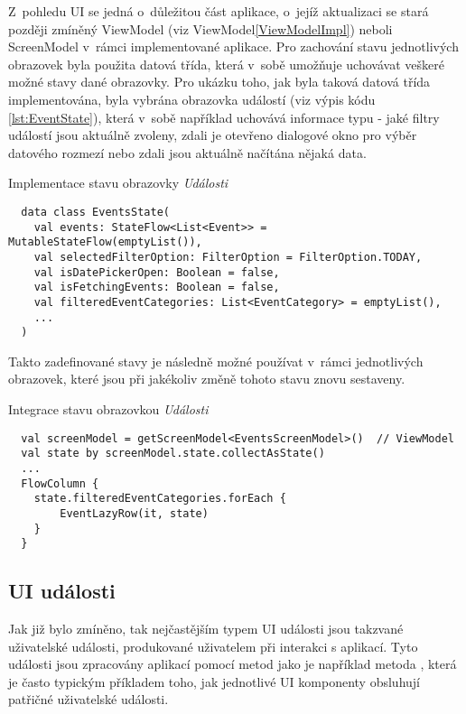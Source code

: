 Z~pohledu UI se jedná o~důležitou část aplikace, o~jejíž aktualizaci se stará později zmíněný ViewModel (viz ViewModel\ref{ViewModelImpl}) neboli ScreenModel v~rámci
implementované aplikace. 
Pro zachování stavu jednotlivých obrazovek byla použita datová třída, která v~sobě umožňuje uchovávat veškeré možné stavy dané obrazovky.
Pro ukázku toho, jak byla taková datová třída implementována, byla vybrána obrazovka událostí (viz výpis kódu \ref{lst:EventState}), která v~sobě 
například uchovává informace typu - jaké filtry událostí jsou aktuálně zvoleny, zdali je otevřeno dialogové okno pro výběr datového rozmezí 
nebo zdali jsou aktuálně načítána nějaká data.
\begin{listing}[H]
\caption{Implementace stavu obrazovky \textit{Události}}\label{lst:EventState}
\begin{verbatim}
  data class EventsState(
    val events: StateFlow<List<Event>> = MutableStateFlow(emptyList()),
    val selectedFilterOption: FilterOption = FilterOption.TODAY,
    val isDatePickerOpen: Boolean = false,
    val isFetchingEvents: Boolean = false,
    val filteredEventCategories: List<EventCategory> = emptyList(),
    ...
  )
\end{verbatim}
\end{listing}

Takto zadefinované stavy je následně možné používat v~rámci jednotlivých obrazovek, které jsou při jakékoliv změně tohoto stavu znovu sestaveny.


\begin{listing}[H]
\caption{Integrace stavu obrazovkou \textit{Události}}\label{lst:StateImpl}
\begin{verbatim}
  val screenModel = getScreenModel<EventsScreenModel>()  // ViewModel
  val state by screenModel.state.collectAsState()
  ...
  FlowColumn {
    state.filteredEventCategories.forEach {
        EventLazyRow(it, state)
    }
  }
\end{verbatim}
\end{listing}

\subsection{UI události} \label{eventHandlingImpl}

Jak již bylo zmíněno, tak nejčastějším typem UI události jsou takzvané uživatelské události, produkované uživatelem při interakci s aplikací.
Tyto události jsou zpracovány aplikací pomocí metod jako je například metoda , která je často typickým příkladem toho, jak
jednotlivé UI komponenty obsluhují patřičné uživatelské události. 

